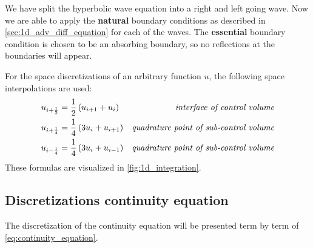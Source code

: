 We have split the hyperbolic wave equation into a right and left going wave.
Now we are able to apply the \textbf{natural} boundary conditions as described in \autoref{sec:1d_adv_diff_equation} for each of the waves.
The \textbf{essential} boundary condition is chosen to be an absorbing boundary, so no reflections at the boundaries will appear.

For the space discretizations of an arbitrary function $u$, the following space interpolations are used:
\begin{align}
    u_{i+\frac{1}{2}} & = \frac{1}{2} \left( u_{i+1} + u_{i} \right) &\textit{interface of control volume}
    \\
    u_{i+\frac{1}{4}} & = \frac{1}{4} \left( 3 u_{i} + u_{i+1} \right) &\textit{quadrature point of sub-control volume}
    \\
    u_{i-\frac{1}{4}} & = \frac{1}{4} \left( 3 u_{i} + u_{i-1} \right) &\textit{quadrature point of sub-control volume}
\end{align}
These formulas are visualized in \autoref{fig:1d_integration}.


\subsection{Discretizations continuity equation}
The discretization of the continuity equation will be presented term by term of \autoref{eq:continuity_equation}.
